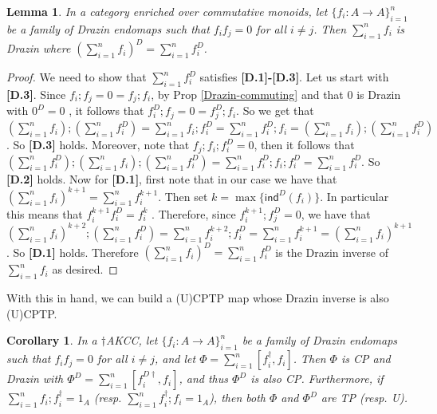 \documentclass[submission,copyright,creativecommons]{eptcs}
\newtheorem{lemma}[observation]{Lemma}  %
\newtheorem{corollary}[observation]{Corollary}
\begin{document}
\begin{lemma}\label{Drazin-sum} In a category enriched over commutative monoids, let $\lbrace f_i: A \to A \rbrace^n_{i=1}$ be a family of Drazin endomaps such that $f_i f_j=0$ for all $i \neq j$. Then $\sum \limits^n_{i=1} f_i$ is Drazin where $\left(\sum \limits^n_{i=1} f_i \right)^D = \sum \limits^n_{i=1} f_i^D$.
\end{lemma}
\begin{proof} We need to show that $\sum \limits^n_{i=1} f_i^D$ satisfies \textbf{[D.1]-[D.3]}. Let us start with \textbf{[D.3]}. Since $f_i;f_j = 0 = f_j;f_i$, by Prop \ref{Drazin-commuting} and that $0$ is Drazin with $0^D=0$ \cite[Lem 6.10]{cockett2024drazin}, it follows that $f_i^D;f_j = 0 = f_j^D;f_i$. So we get that $\left(\sum \limits^n_{i=1} f_i \right) ; \left(\sum \limits^n_{i=1} f_i^D \right) = \sum \limits^n_{i=1} f_i;f_i^D = \sum \limits^n_{i=1} f_i^D ;f_i = \left(\sum \limits^n_{i=1} f_i \right) ; \left(\sum \limits^n_{i=1} f_i^D \right)$. So \textbf{[D.3]} holds. Moreover, note that $f_j; f_i; f_i^D =0$, then it follows that $\left(\sum \limits^n_{i=1} f_i^D \right);\left(\sum \limits^n_{i=1} f_i \right) ; \left(\sum \limits^n_{i=1} f_i^D \right) = \sum \limits^n_{i=1} f_i^D ;f_i;f_i^D =\sum \limits^n_{i=1} f_i^D$. So \textbf{[D.2]} holds. Now for \textbf{[D.1]}, first note that in our case we have that $\left(\sum \limits^n_{i=1} f_i \right)^{k+1} = \sum\limits^{n}_{i=1} f_i^{k+1}$. Then set $k=\max\lbrace \mathsf{ind}^D(f_i) \rbrace$. In particular this means that $f_i^{k+1} f^D_i = f^{k}_i$ \cite[Lem 2.3.(i)]{cockett2024drazin}. Therefore, since $f_i^{k+1};f_j^D =0$, we have that $\left(\sum \limits^n_{i=1} f_i \right)^{k+2}; \left(\sum \limits^n_{i=1} f_i^D \right) = \sum \limits_{i=1}^n f^{k+2}_i;f_i^D = \sum \limits_{i=1}^n f^{k+1}_i =\left(\sum \limits^n_{i=1} f_i \right)^{k+1}$. So \textbf{[D.1]} holds. Therefore $\left(\sum \limits^n_{i=1} f_i \right)^D = \sum \limits^n_{i=1} f_i^D$ is the Drazin inverse of $\sum \limits^n_{i=1} f_i$ as desired. 
\end{proof}

With this in hand, we can build a (U)CPTP map whose Drazin inverse is also (U)CPTP. 

\begin{corollary}\label{cor:draz-phi-sum} In a $\dagger$AKCC, let $\lbrace f_i: A \to A \rbrace^n_{i=1}$ be a family of Drazin endomaps such that $f_i f_j=0$ for all $i \neq j$, and let $\Phi = \sum\limits_{i=1}^n [f_i^\dagger,f_i]$. Then $\Phi$ is CP and Drazin with $\Phi^D = \sum\limits_{i=1}^n [f_i^{D\dagger},f_i]$, and thus $\Phi^D$ is also CP. Furthermore, if $\sum\limits_{i=1}^n f_i;f_i^\dagger = 1_A$ (resp. $\sum\limits_{i=1}^n f_i^\dagger;f_i = 1_A$), then both $\Phi$ and $\Phi^D$ are TP (resp. U). 
\end{corollary}
\end{document}
